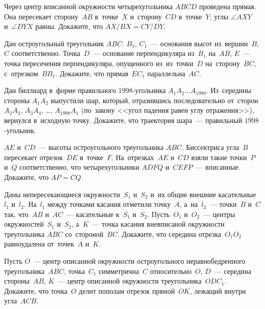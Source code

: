 



\begin{problems}

\item
Через центр вписанной окружности четырехугольника $ABCD$ проведена прямая.
Она пересекает сторону~$AB$ в~точке~$X$ и~сторону~$CD$ в~точке~$Y$;
углы $\angle AXY$ и~$\angle DYX$ равны.
Докажите, что $AX/BX = CY/DY$.

\item
Дан остроугольный треугольник $ABC$.
$B_1$, $C_1$~--- основания высот из~вершин~$B$, $C$ соответственно.
Точка~$D$~--- основание перпендикуляра из~$B_1$ на~$AB$, $E$~--- точка
пересечения перпендикуляра, опущенного из~из~точки~$D$ на~сторону~$BC$,
с~отрезком~$B B_1$.
Докажите, что прямая~$E C_1$ параллельна~$AC$.

\item
Дан биллиард в~форме правильного $1998$-угольника $A_1 A_2 {\ldots} A_{1998}$.
Из~середины стороны $A_1 A_2$ выпустили шар, который, отразившись
последовательно от~сторон $A_2 A_3$, $A_3 A_4$, \ldots, $A_{1998} A_1$
(по~закону <<угол падения равен углу отражения>>), вернулся в~исходную точку.
Докажите, что траектория шара~--- правильный $1998$-угольник.

\item
$AE$ и~$CD$~--- высоты остроугольного треугольника $ABC$.
Биссектриса угла~$B$ пересекает отрезок~$DE$ в~точке~$F$.
На~отрезках~$AE$ и~$CD$ взяли такие точки~$P$ и~$Q$ соответственно, что
четырехугольники $ADFQ$ и~$CEFP$~--- вписанные.
Докажите, что $AP = CQ$.

\item
Даны непересекающиеся окружности~$S_1$ и~$S_2$ и~их общие внешние
касательные~$l_1$ и~$l_2$.
На~$l_1$ между точками касания отметили точку~$A$, а~на~$l_2$~--- точки~$B$
и~$C$ так, что~$AB$ и~$AC$~--- касательные к~$S_1$ и~$S_2$.
Пусть~$O_1$ и~$O_2$~--- центры окружностей~$S_1$ и~$S_2$, а~$K$~--- точка
касания вневписаной окружности треугольника $ABC$ со~стороной~$BC$.
Докажите, что середина отрезка~$O_1 O_2$ равноудалена от~точек~$A$ и~$K$.

\item
Пусть $O$~--- центр описанной окружности остроугольного неравнобедренного
треугольника~$ABC$, точка~$C_1$ симметрична~$C$ относительно~$O$,
$D$~--- середина стороны~$AB$, $K$~--- центр описанной окружности
треугольника~$O D C_1$.
Докажите, что точка~$O$ делит пополам отрезок прямой~$OK$, лежащий внутри
угла~$ACB$.

\end{problems}

